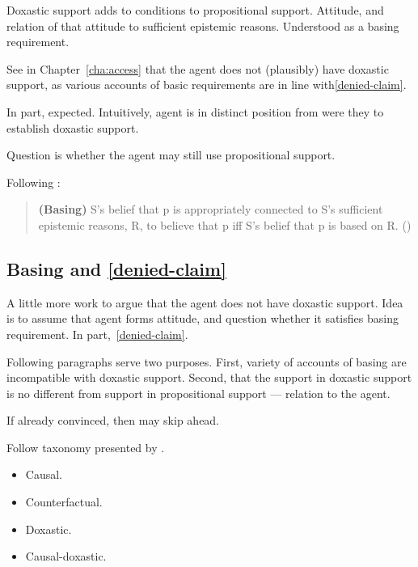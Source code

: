 \begin{note}
  Doxastic support adds to conditions to propositional support.
  Attitude, and relation of that attitude to sufficient epistemic reasons.
  Understood as a basing requirement.

  See in Chapter~\ref{cha:access} that the agent does not (plausibly) have doxastic support, as various accounts of basic requirements are in line with\ref{denied-claim}.

  In part, expected.
  Intuitively, agent is in distinct position from were they to establish doxastic support.

  Question is whether the agent may still use propositional support.
\end{note}

\begin{note}[Basing]
  Following \citeauthor{Silva:2020aa}:
  \begin{quote}
    \textbf{(Basing)} S's belief that p is appropriately connected to S's sufficient epistemic reasons, R, to believe that p iff S's belief that p is based on R.\nolinebreak
    \mbox{}\hfill\mbox{(\citeyear{Silva:2020aa})}
  \end{quote}
\end{note}

\subsection{Basing and \ref{denied-claim}}

\begin{note}
  A little more work to argue that the agent does not have doxastic support.
  Idea is to assume that agent forms attitude, and question whether it satisfies basing requirement.
  In part,~\ref{denied-claim}.
\end{note}

\begin{note}
  Following paragraphs serve two purposes.
  First, variety of accounts of basing are incompatible with doxastic support.
  Second, that the support in doxastic support is no different from support in propositional support --- relation to the agent.

  If already convinced, then may skip ahead.
\end{note}

\begin{note}
  Follow taxonomy presented by \textcite{Korcz:2021ue}.
  \begin{itemize}
  \item Causal.
  \item Counterfactual.
  \item Doxastic.
  \item Causal-doxastic.
  \end{itemize}
\end{note}

